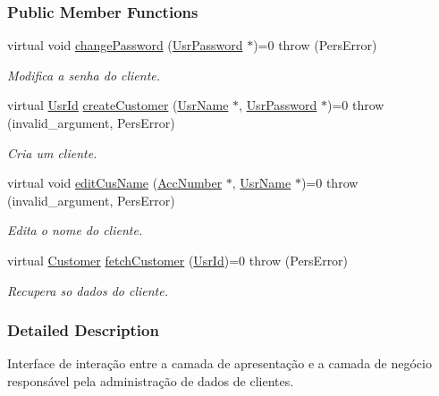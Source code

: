 \subsubsection*{Public Member Functions}
\begin{DoxyCompactItemize}
\item 
virtual void \hyperlink{classUserCusAdm_aa78ba1b0eb4f14ca68f8ef2318e9c3d1}{change\-Password} (\hyperlink{classUsrPassword}{Usr\-Password} $\ast$)=0  throw (\-Pers\-Error)
\begin{DoxyCompactList}\small\item\em Modifica a senha do cliente. \end{DoxyCompactList}\item 
virtual \hyperlink{classUsrId}{Usr\-Id} \hyperlink{classUserCusAdm_a4775bb30caf44192349db204b95b2b2f}{create\-Customer} (\hyperlink{classUsrName}{Usr\-Name} $\ast$, \hyperlink{classUsrPassword}{Usr\-Password} $\ast$)=0  throw (invalid\-\_\-argument, Pers\-Error)
\begin{DoxyCompactList}\small\item\em Cria um cliente. \end{DoxyCompactList}\item 
virtual void \hyperlink{classUserCusAdm_a6105bcc548efb475bae0bc36b58743a2}{edit\-Cus\-Name} (\hyperlink{classAccNumber}{Acc\-Number} $\ast$, \hyperlink{classUsrName}{Usr\-Name} $\ast$)=0  throw (invalid\-\_\-argument, Pers\-Error)
\begin{DoxyCompactList}\small\item\em Edita o nome do cliente. \end{DoxyCompactList}\item 
virtual \hyperlink{classCustomer}{Customer} \hyperlink{classUserCusAdm_a8a67bf25c965e931be912f33449e0f8a}{fetch\-Customer} (\hyperlink{classUsrId}{Usr\-Id})=0  throw (\-Pers\-Error)
\begin{DoxyCompactList}\small\item\em Recupera so dados do cliente. \end{DoxyCompactList}\end{DoxyCompactItemize}


\subsubsection{Detailed Description}
Interface de interação entre a camada de apresentação e a camada de negócio responsável pela administração de dados de clientes. 



